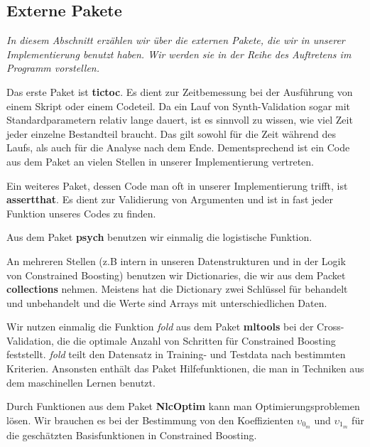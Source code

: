 \documentclass[12pt,a4paper,twoside]{scrartcl}
\numberwithin{equation}{section}
\begin{document}
\subsection{Externe Pakete}\label{subsec:externePaketen}

\noindent
\emph{In diesem Abschnitt erzählen wir über die externen Pakete, die wir in unserer Implementierung benutzt haben. Wir werden sie in der Reihe des Auftretens im Programm vorstellen.}\par

Das erste Paket ist \textbf{tictoc}. Es dient zur Zeitbemessung bei der Ausführung von einem Skript oder einem Codeteil. Da ein Lauf von Synth-Validation sogar mit Standardparametern relativ lange dauert, ist es sinnvoll zu wissen, wie viel Zeit jeder einzelne Bestandteil braucht. Das gilt sowohl für die Zeit während des Laufs, als auch für die Analyse nach dem Ende. Dementsprechend ist ein Code aus dem Paket an vielen Stellen in unserer Implementierung vertreten.
\par

\noindent
Ein weiteres Paket, dessen Code man oft in unserer Implementierung trifft, ist \textbf{assertthat}. Es dient zur Validierung von Argumenten und ist in fast jeder Funktion unseres Codes zu finden.
\par

\noindent
Aus dem Paket \textbf{psych} benutzen wir einmalig die logistische Funktion.\par 

\noindent
An mehreren Stellen (z.B intern in unseren Datenstrukturen und in der Logik von Constrained Boosting) benutzen wir Dictionaries, die wir aus dem Packet \textbf{collections} nehmen. Meistens hat die Dictionary zwei Schlüssel für behandelt und unbehandelt und die Werte sind Arrays mit unterschiedlichen Daten.\par

\noindent
Wir nutzen einmalig die Funktion \emph{fold} aus dem Paket \textbf{mltools} bei der Cross-Validation, die die optimale Anzahl von Schritten für Constrained Boosting feststellt. \emph{fold} teilt den Datensatz in Training- und Testdata nach bestimmten Kriterien. Ansonsten enthält das Paket Hilfefunktionen, die man in Techniken aus dem maschinellen Lernen benutzt.\par 
 
\noindent
Durch Funktionen aus dem Paket \textbf{NlcOptim} kann man Optimierungsproblemen lösen. Wir brauchen es bei der Bestimmung von den Koeffizienten $\upsilon_{0_m}$ und $\upsilon_{1_m}$ für die geschätzten Basisfunktionen in Constrained Boosting.\par 
 
\end{document}
